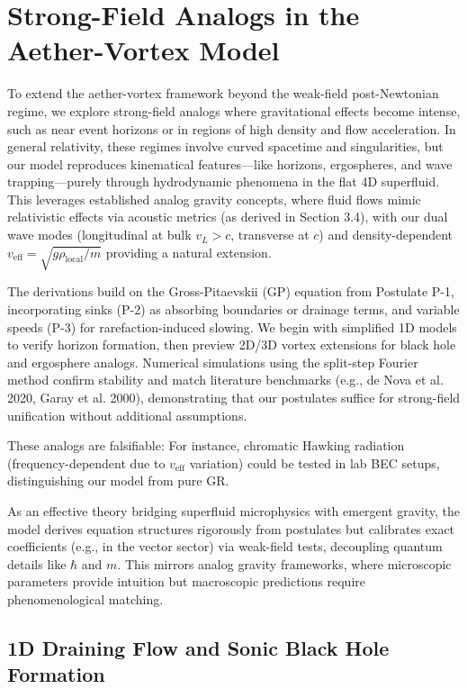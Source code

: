 \documentclass{article}
\begin{document}
\section{Strong-Field Analogs in the Aether-Vortex Model}

To extend the aether-vortex framework beyond the weak-field post-Newtonian regime, we explore strong-field analogs where gravitational effects become intense, such as near event horizons or in regions of high density and flow acceleration. In general relativity, these regimes involve curved spacetime and singularities, but our model reproduces kinematical features---like horizons, ergospheres, and wave trapping---purely through hydrodynamic phenomena in the flat 4D superfluid. This leverages established analog gravity concepts, where fluid flows mimic relativistic effects via acoustic metrics (as derived in Section 3.4), with our dual wave modes (longitudinal at bulk $v_L > c$, transverse at $c$) and density-dependent $v_{\text{eff}} = \sqrt{g \rho_{\text{local}} / m}$ providing a natural extension.

The derivations build on the Gross-Pitaevskii (GP) equation from Postulate P-1, incorporating sinks (P-2) as absorbing boundaries or drainage terms, and variable speeds (P-3) for rarefaction-induced slowing. We begin with simplified 1D models to verify horizon formation, then preview 2D/3D vortex extensions for black hole and ergosphere analogs. Numerical simulations using the split-step Fourier method confirm stability and match literature benchmarks (e.g., de Nova et al. 2020, Garay et al. 2000), demonstrating that our postulates suffice for strong-field unification without additional assumptions.

These analogs are falsifiable: For instance, chromatic Hawking radiation (frequency-dependent due to $v_{\text{eff}}$ variation) could be tested in lab BEC setups, distinguishing our model from pure GR.

As an effective theory bridging superfluid microphysics with emergent gravity, the model derives equation structures rigorously from postulates but calibrates exact coefficients (e.g., in the vector sector) via weak-field tests, decoupling quantum details like $\hbar$ and $m$. This mirrors analog gravity frameworks, where microscopic parameters provide intuition but macroscopic predictions require phenomenological matching.

\subsection{1D Draining Flow and Sonic Black Hole Formation}
\end{document}
